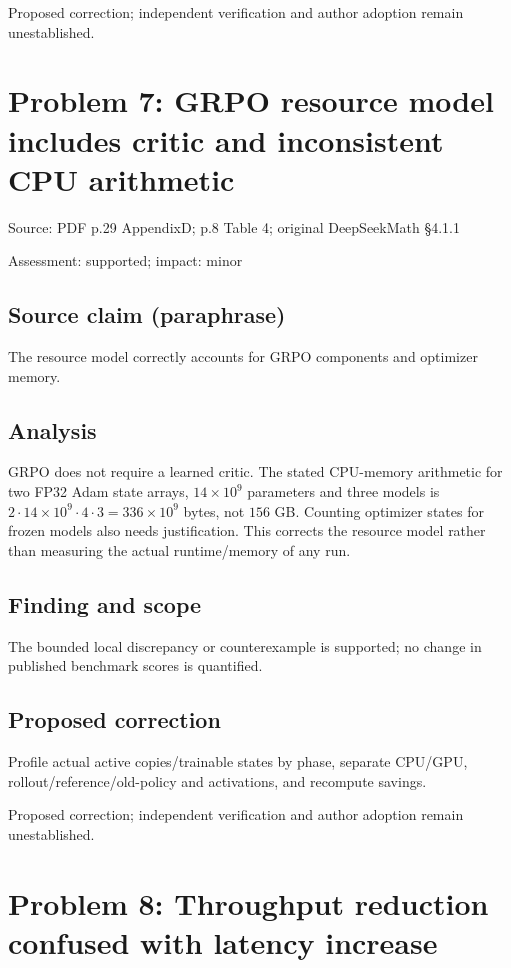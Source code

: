 \documentclass[11pt]{article}
\begin{document}
Proposed correction; independent verification and author adoption remain unestablished.

\section*{Problem 7: GRPO resource model includes critic and inconsistent CPU arithmetic}

Source: PDF p.29 AppendixD; p.8 Table 4; original DeepSeekMath §4.1.1

Assessment: supported; impact: minor

\subsection*{Source claim (paraphrase)}

The resource model correctly accounts for GRPO components and optimizer memory.

\subsection*{Analysis}

GRPO does not require a learned critic. The stated CPU-memory arithmetic for two FP32 Adam state arrays, \(14\times10^9\) parameters and three models is \(2\cdot14\times10^9\cdot4\cdot3=336\times10^9\) bytes, not \(156\) GB. Counting optimizer states for frozen models also needs justification. This corrects the resource model rather than measuring the actual runtime/memory of any run.

\subsection*{Finding and scope}

The bounded local discrepancy or counterexample is supported; no change in published benchmark scores is quantified.

\subsection*{Proposed correction}

Profile actual active copies/trainable states by phase, separate CPU/GPU, rollout/reference/old-policy and activations, and recompute savings.

Proposed correction; independent verification and author adoption remain unestablished.

\section*{Problem 8: Throughput reduction confused with latency increase}
\end{document}

